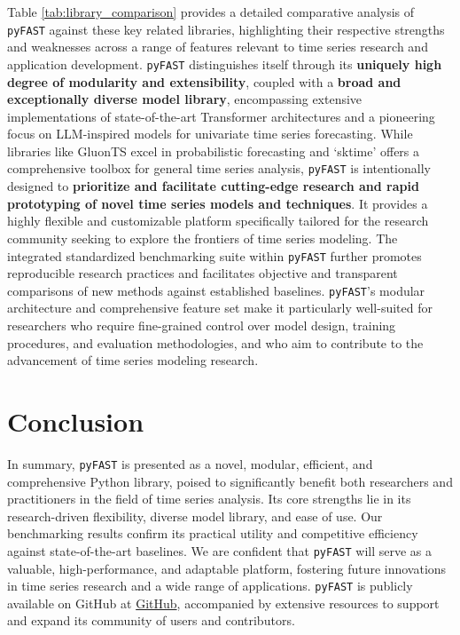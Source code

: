 \documentclass{article}
\begin{document}
Table \ref{tab:library_comparison} provides a detailed comparative analysis of \texttt{pyFAST} against these key related libraries, highlighting their respective strengths and weaknesses across a range of features relevant to time series research and application development.  \texttt{pyFAST} distinguishes itself through its \textbf{uniquely high degree of modularity and extensibility}, coupled with a \textbf{broad and exceptionally diverse model library}, encompassing extensive implementations of state-of-the-art Transformer architectures and a pioneering focus on LLM-inspired models for univariate time series forecasting.  While libraries like GluonTS excel in probabilistic forecasting and `sktime' offers a comprehensive toolbox for general time series analysis, \texttt{pyFAST} is intentionally designed to \textbf{prioritize and facilitate cutting-edge research and rapid prototyping of novel time series models and techniques}.  It provides a highly flexible and customizable platform specifically tailored for the research community seeking to explore the frontiers of time series modeling.  The integrated standardized benchmarking suite within \texttt{pyFAST} further promotes reproducible research practices and facilitates objective and transparent comparisons of new methods against established baselines.  \texttt{pyFAST}'s modular architecture and comprehensive feature set make it particularly well-suited for researchers who require fine-grained control over model design, training procedures, and evaluation methodologies, and who aim to contribute to the advancement of time series modeling research.

\section{Conclusion}
In summary, \texttt{pyFAST} is presented as a novel, modular, efficient, and comprehensive Python library, poised to significantly benefit both researchers and practitioners in the field of time series analysis. Its core strengths lie in its research-driven flexibility, diverse model library, and ease of use.  Our benchmarking results confirm its practical utility and competitive efficiency against state-of-the-art baselines. We are confident that \texttt{pyFAST} will serve as a valuable, high-performance, and adaptable platform, fostering future innovations in time series research and a wide range of applications. \texttt{pyFAST} is publicly available on GitHub at \href{https://github.com/anonymous-code-for-peer-review/pyFAST}{GitHub}, accompanied by extensive resources to support and expand its community of users and contributors.



\end{document}
